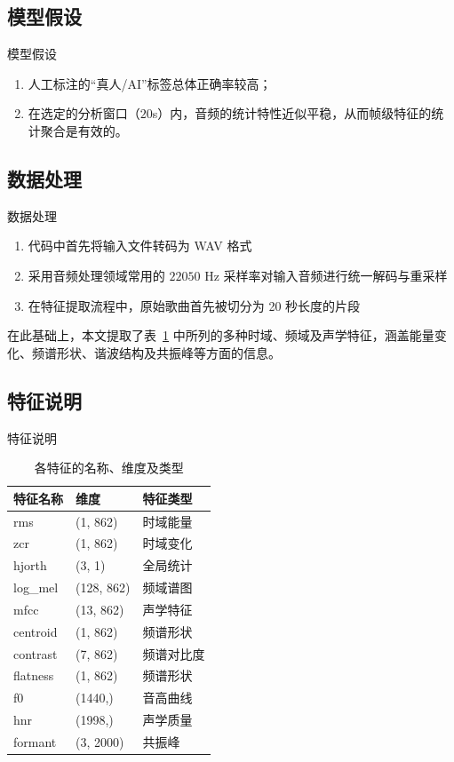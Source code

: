 \documentclass[aspectratio=169]{beamer}
\begin{document}
\subsection{模型假设}
\begin{frame}{模型假设}
\small
\begin{enumerate}
    \item 人工标注的“真人/AI”标签总体正确率较高；
    \item 在选定的分析窗口（$20$s）内，音频的统计特性近似平稳，从而帧级特征的统计聚合是有效的。
\end{enumerate}
\end{frame}

\subsection{数据处理}
\begin{frame}{数据处理}
  \small
  \begin{enumerate}
    \item{代码中首先将输入文件转码为 WAV 格式}
    \item{采用音频处理领域常用的 $22050$ Hz 采样率对输入音频进行统一解码与重采样}
    \item{在特征提取流程中，原始歌曲首先被切分为 20 秒长度的片段}
  \end{enumerate}
在此基础上，本文提取了表~\ref{tab:audio-features} 中所列的多种时域、频域及声学特征，涵盖能量变化、频谱形状、谐波结构及共振峰等方面的信息。
\end{frame}

\subsection{特征说明}
\begin{frame}{特征说明}
\begin{table}
  \centering
  \begin{tabular}{lll}
    \toprule
    特征名称 & 维度 & 特征类型 \\
    \midrule
    rms       & (1, 862)   & 时域能量 \\
    zcr       & (1, 862)   & 时域变化 \\
    hjorth    & (3, 1)     & 全局统计 \\
    log\_mel  & (128, 862) & 频域谱图 \\
    mfcc      & (13, 862)  & 声学特征 \\
    centroid  & (1, 862)   & 频谱形状 \\
    contrast  & (7, 862)   & 频谱对比度 \\
    flatness  & (1, 862)   & 频谱形状 \\
    f0        & (1440,)    & 音高曲线 \\
    hnr       & (1998,)    & 声学质量 \\
    formant   & (3, 2000)  & 共振峰 \\
    \bottomrule
  \end{tabular}
  \caption{各特征的名称、维度及类型}\label{tab:audio-features}
\end{table}
\end{frame}
\end{document}
